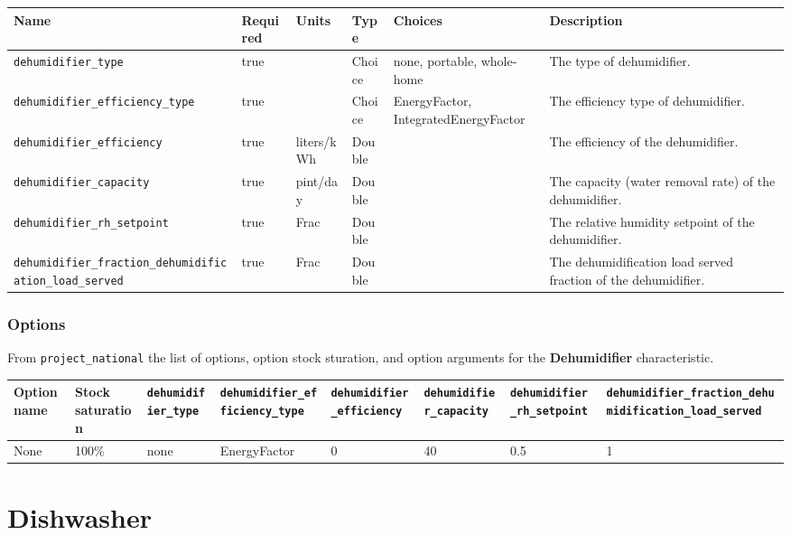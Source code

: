 \begin{longtable}[]{@{}llllll@{}}
\toprule\noalign{}
Name & Required & Units & Type & Choices & Description \\
\midrule\noalign{}
\endhead
\bottomrule\noalign{}
\endlastfoot
\texttt{dehumidifier\_type} & true & & Choice & none, portable,
whole-home & The type of dehumidifier. \\
\texttt{dehumidifier\_efficiency\_type} & true & & Choice &
EnergyFactor, IntegratedEnergyFactor & The efficiency type of
dehumidifier. \\
\texttt{dehumidifier\_efficiency} & true & liters/kWh & Double & & The
efficiency of the dehumidifier. \\
\texttt{dehumidifier\_capacity} & true & pint/day & Double & & The
capacity (water removal rate) of the dehumidifier. \\
\texttt{dehumidifier\_rh\_setpoint} & true & Frac & Double & & The
relative humidity setpoint of the dehumidifier. \\
\texttt{dehumidifier\_fraction\_dehumidification\_load\_served} & true &
Frac & Double & & The dehumidification load served fraction of the
dehumidifier. \\
\end{longtable}

\subsubsection{Options}\label{options-31}

From \texttt{project\_national} the list of options, option stock
sturation, and option arguments for the \textbf{Dehumidifier}
characteristic.

\begin{longtable}[]{@{}llllllll@{}}
\toprule\noalign{}
Option name & Stock saturation & \texttt{dehumidifier\_type} &
\texttt{dehumidifier\_efficiency\_type} &
\texttt{dehumidifier\_efficiency} & \texttt{dehumidifier\_capacity} &
\texttt{dehumidifier\_rh\_setpoint} &
\texttt{dehumidifier\_fraction\_dehumidification\_load\_served} \\
\midrule\noalign{}
\endhead
\bottomrule\noalign{}
\endlastfoot
None & 100\% & none & EnergyFactor & 0 & 40 & 0.5 & 1 \\
\end{longtable}

\section{Dishwasher}\label{dishwasher}

